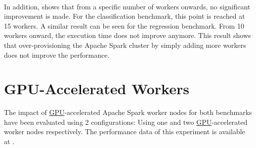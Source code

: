 \paragraph{}
In addition,  shows that from a specific number of workers onwards, no significant improvement is made.
For the classification benchmark, this point is reached at 15 workers.
A similar result can be seen for the regression benchmark. From 10 workers onward, the execution time does not improve anymore.
This result shows that over-provisioning the Apache Spark cluster by simply adding more workers does not improve the performance.


\section{GPU-Accelerated Workers}
\label{sec:07_gpu}
The impact of \hyperlink{abbr:gpu}{GPU}-accelerated Apache Spark worker nodes for both benchmarks have been evaluated using 2 configurations: Using one and two \hyperlink{abbr:gpu}{GPU}-accelerated worker nodes respectively.
%
The performance data of this experiment is available at .


